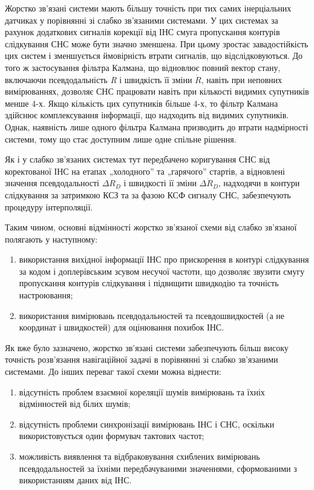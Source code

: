 Жорстко зв'язані системи мають більшу точність при тих самих інерціальних датчиках 
у порівнянні зі слабко зв'язаними системами. У цих системах за рахунок додаткових 
сигналів корекції від  ІНС смуга пропускання контурів слідкування СНС може бути значно 
зменшена. При цьому зростає завадостійкість цих систем і зменшується ймовірність 
втрати сигналів, що відслідковуються. До того ж застосування фільтра Калмана, що 
відновлює повний вектор стану, включаючи  псевдодальність \textit{R} і швидкість 
її зміни $\dot{R}$, навіть при неповних вимірюваннях, дозволяє СНС працювати навіть 
при кількості видимих супутників менше 4-х. Якщо кількість цих супутників більше 
4-х, то фільтр Калмана здійснює комплексування інформації, що надходить від видимих 
супутників. Однак, наявність лише одного фільтра Калмана призводить до втрати надмірності 
системи, тому що стає доступним лише одне спільне рішення. 

Як і у слабко зв'язаних системах тут передбачено коригування СНС від коректованої 
ІНС на етапах „холодного'' та „гарячого'' стартів, а відновлені значення псевдодальності 
$\Delta R_{D}$ і швидкості її зміни $\Delta \dot{R}_{D} $, надходячи в контури 
слідкування за затримкою КСЗ  та за фазою КСФ сигналу СНС, забезпечують процедуру 
інтерполяції.

Таким чином, основні відмінності жорстко зв'язаної схеми від слабко зв'язаної полягають 
у наступному:

\begin{enumerate}
\item використання вихідної інформації ІНС про прискорення в контурі слідкування 
за кодом і доплерівським зсувом несучої частоти, що дозволяє звузити смугу пропускання 
контурів слідкування і підвищити швидкодію та точність настроювання;
\item використання вимірювань псевдодальностей та псевдошвидкостей (а не координат 
і швидкостей) для оцінювання похибок ІНС.
\end{enumerate}

Як вже було зазначено, жорстко зв'язані системи забезпечують більш високу точність 
розв'язання навігаційної задачі в порівнянні зі слабко зв'язаними системами. До інших 
переваг такої схеми можна віднести:

\begin{enumerate}
\item відсутність проблем взаємної кореляції шумів вимірювань та їхніх відмінностей 
від білих шумів;
\item відсутність проблеми синхронізації вимірювань ІНС і СНС, оскільки використовується 
один формувач тактових частот;
\item можливість виявлення та відбраковування схиблених вимірювань псевдодальностей 
за їхніми передбачуваними значеннями, сформованими з використанням даних від ІНС.
\end{enumerate}

